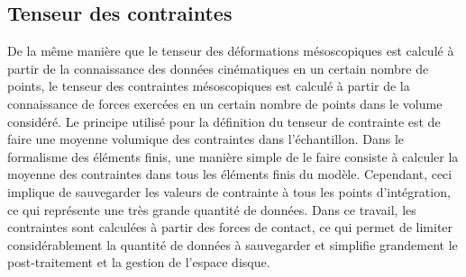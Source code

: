 	\subsection{Tenseur des contraintes}\label{para06:love_weber}
		De la même manière que le tenseur des déformations mésoscopiques est calculé à partir de la connaissance des données cinématiques en un certain nombre de points, le tenseur des contraintes mésoscopiques est calculé à partir de la connaissance de forces exercées en un certain nombre de points dans le volume considéré. Le principe utilisé pour la définition du tenseur de contrainte est de faire une moyenne volumique des contraintes dans l'échantillon. Dans le formalisme des éléments finis, une manière simple de le faire consiste à calculer la moyenne des contraintes dans tous les éléments finis du modèle. Cependant, ceci implique de sauvegarder les valeurs de contrainte à tous les points d'intégration, ce qui représente une très grande quantité de données. Dans ce travail, les contraintes sont calculées à partir des forces de contact, ce qui permet de limiter considérablement la quantité de données à sauvegarder et simplifie  grandement le post-traitement et la gestion de l'espace disque.
